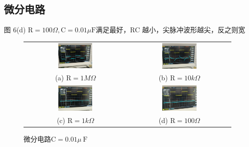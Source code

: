 \documentclass{article}
\begin{document}
\subsection{微分电路}
图 6(d) $\mathrm{R}=100 \Omega, \mathrm{C}=0.01 \mu \mathrm{F}$满足最好，RC 越小，尖脉冲波形越尖，反之则宽
\begin{figure}[h]
    \centering
    \begin{tabular}{cc}
        \includegraphics[width=0.35\textwidth]{1M.jpg} &
        \includegraphics[width=0.35\textwidth]{10k.jpg} \\
        (a) $\mathrm{R}=1M \Omega $& (b) $\mathrm{R}=10k \Omega $ \\
        \includegraphics[width=0.35\textwidth]{1k.jpg} &
        \includegraphics[width=0.35\textwidth]{100.jpg} \\
        (c) $\mathrm{R}=1k \Omega $ & (d) $\mathrm{R}=100 \Omega $ \\
    \end{tabular}
    \caption{微分电路$\mathrm{C}=0.01 \mu \mathrm{~F}$}
    \label{fig:grouped_images}
\end{figure}
\end{document}
